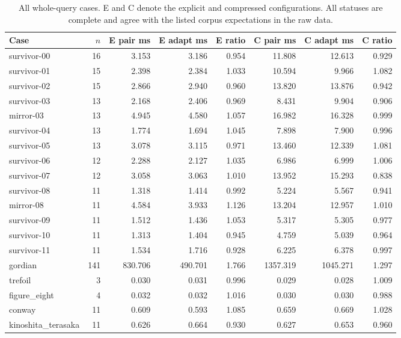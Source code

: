 \begin{table}[htbp]
\centering\small
\setlength{\tabcolsep}{4pt}
\begin{tabular}{@{}lrrrrrrr@{}}
\toprule
Case & $n$ & E pair ms & E adapt ms & E ratio & C pair ms & C adapt ms & C ratio\\\midrule
survivor-00 & 16 & 3.153 & 3.186 & 0.954 & 11.808 & 12.613 & 0.929\\
survivor-01 & 15 & 2.398 & 2.384 & 1.033 & 10.594 & 9.966 & 1.082\\
survivor-02 & 15 & 2.866 & 2.940 & 0.960 & 13.820 & 13.876 & 0.942\\
survivor-03 & 13 & 2.168 & 2.406 & 0.969 & 8.431 & 9.904 & 0.906\\
mirror-03 & 13 & 4.945 & 4.580 & 1.057 & 16.982 & 16.328 & 0.999\\
survivor-04 & 13 & 1.774 & 1.694 & 1.045 & 7.898 & 7.900 & 0.996\\
survivor-05 & 13 & 3.078 & 3.115 & 0.971 & 13.460 & 12.339 & 1.081\\
survivor-06 & 12 & 2.288 & 2.127 & 1.035 & 6.986 & 6.999 & 1.006\\
survivor-07 & 12 & 3.058 & 3.063 & 1.010 & 13.952 & 15.293 & 0.838\\
survivor-08 & 11 & 1.318 & 1.414 & 0.992 & 5.224 & 5.567 & 0.941\\
mirror-08 & 11 & 4.584 & 3.933 & 1.126 & 13.204 & 12.957 & 1.010\\
survivor-09 & 11 & 1.512 & 1.436 & 1.053 & 5.317 & 5.305 & 0.977\\
survivor-10 & 11 & 1.313 & 1.404 & 0.945 & 4.759 & 5.039 & 0.964\\
survivor-11 & 11 & 1.534 & 1.716 & 0.928 & 6.225 & 6.378 & 0.997\\
gordian & 141 & 830.706 & 490.701 & 1.766 & 1357.319 & 1045.271 & 1.297\\
trefoil & 3 & 0.030 & 0.031 & 0.996 & 0.029 & 0.028 & 1.009\\
figure\_eight & 4 & 0.032 & 0.032 & 1.016 & 0.030 & 0.030 & 0.988\\
conway & 11 & 0.609 & 0.593 & 1.085 & 0.659 & 0.669 & 1.028\\
kinoshita\_terasaka & 11 & 0.626 & 0.664 & 0.930 & 0.627 & 0.653 & 0.960\\
\bottomrule
\end{tabular}
\caption{All whole-query cases. E and C denote the explicit and compressed configurations. All statuses are complete and agree with the listed corpus expectations in the raw data.}
\label{tab:corpus}
\end{table}
